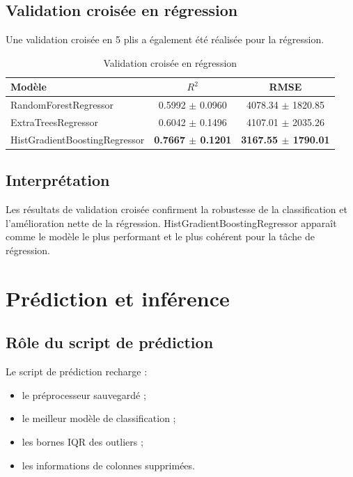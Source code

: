 \documentclass[11pt,a4paper]{article}
\begin{document}
\subsection{Validation croisée en régression}
Une validation croisée en 5 plis a également été réalisée pour la régression.

\begin{table}[H]
\centering
\caption{Validation croisée en régression}
\begin{tabular}{lcc}
\toprule
\textbf{Modèle} & \textbf{\(R^2\)} & \textbf{RMSE} \\
\midrule
RandomForestRegressor & 0.5992 $\pm$ 0.0960 & 4078.34 $\pm$ 1820.85 \\
ExtraTreesRegressor & 0.6042 $\pm$ 0.1496 & 4107.01 $\pm$ 2035.26 \\
HistGradientBoostingRegressor & \textbf{0.7667 $\pm$ 0.1201} & \textbf{3167.55 $\pm$ 1790.01} \\
\bottomrule
\end{tabular}
\end{table}

\subsection{Interprétation}
Les résultats de validation croisée confirment la robustesse de la classification et l’amélioration nette de la régression. HistGradientBoostingRegressor apparaît comme le modèle le plus performant et le plus cohérent pour la tâche de régression.

\section{Prédiction et inférence}

\subsection{Rôle du script de prédiction}
Le script de prédiction recharge :
\begin{itemize}
    \item le préprocesseur sauvegardé ;
    \item le meilleur modèle de classification ;
    \item les bornes IQR des outliers ;
    \item les informations de colonnes supprimées.
\end{itemize}
\end{document}
